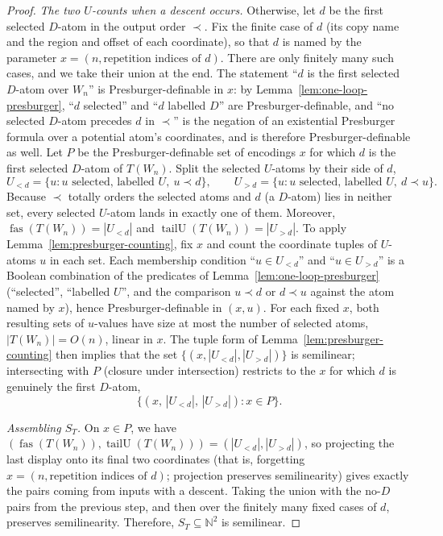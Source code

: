 \documentclass[11pt]{article}
\theoremstyle{definition}
\newcommand{\N}{\mathbb N}
\newcommand{\fas}{\operatorname{fas}}
\newcommand{\tailU}{\operatorname{tailU}}
\begin{document}
\begin{proof}
\vspace{0.5em}
\noindent\emph{The two $U$-counts when a descent occurs.}
Otherwise, let $d$ be the first selected $D$-atom in the output order $\prec$.
Fix the finite case of $d$ (its copy name and the region and offset of each
coordinate), so that $d$ is named by the parameter
$x=(n,\text{repetition indices of }d)$.  There are only finitely many such cases, and
we take their union at the end.  The statement ``$d$ is the
first selected $D$-atom over $W_n$'' is Presburger-definable in $x$: by
Lemma~\ref{lem:one-loop-presburger}, ``$d$ selected'' and ``$d$ labelled $D$''
are Presburger-definable, and ``no selected $D$-atom precedes $d$ in $\prec$''
is the negation of an existential Presburger formula over a potential atom's
coordinates, and is therefore Presburger-definable as well.  Let $P$ be the
Presburger-definable set of encodings $x$ for
which $d$ is the first selected $D$-atom of $T(W_n)$.
Split the selected $U$-atoms by their side of $d$,
\[
   U_{<d}=\{u: u\text{ selected, labelled }U,\ u\prec d\},\qquad
   U_{>d}=\{u: u\text{ selected, labelled }U,\ d\prec u\}.
\]
Because $\prec$ totally orders the selected atoms and $d$ (a $D$-atom) lies in
neither set, every selected $U$-atom lands in exactly one of them.  Moreover,
$\fas(T(W_n))=|U_{<d}|$ and $\tailU(T(W_n))=|U_{>d}|$.  To apply
Lemma~\ref{lem:presburger-counting}, fix $x$ and count the coordinate tuples of
$U$-atoms $u$ in each set.  Each membership condition ``$u\in U_{<d}$'' and
``$u\in U_{>d}$'' is a Boolean combination of the predicates of
Lemma~\ref{lem:one-loop-presburger} (``selected'', ``labelled $U$'', and the
comparison $u\prec d$ or $d\prec u$ against the atom named by $x$), hence
Presburger-definable in $(x,u)$.  For each fixed $x$, both resulting sets of
$u$-values have size at most the number of selected atoms,
$|T(W_n)|=O(n)$, linear in $x$.  The tuple form of
Lemma~\ref{lem:presburger-counting} then implies that the set
$\{(x,|U_{<d}|,|U_{>d}|)\}$ is semilinear; intersecting with $P$ (closure under
intersection) restricts to the $x$ for which $d$ is genuinely the first $D$-atom,
\[
   \bigl\{(x,\,|U_{<d}|,\,|U_{>d}|):x\in P\bigr\}.
\]

\vspace{0.5em}
\noindent\emph{Assembling $S_T$.}
On $x\in P$, we have $(\fas(T(W_n)),\tailU(T(W_n)))=(|U_{<d}|,|U_{>d}|)$, so
projecting the last display onto its final two coordinates (that is, forgetting
$x=(n,\text{repetition indices of }d)$; projection preserves semilinearity)
gives exactly the pairs coming from inputs with a descent.  Taking the union
with the no-$D$ pairs from the previous step, and then over the finitely many
fixed cases of $d$, preserves semilinearity.  Therefore, $S_T\subseteq\N^2$ is
semilinear.
\end{proof}
\end{document}
